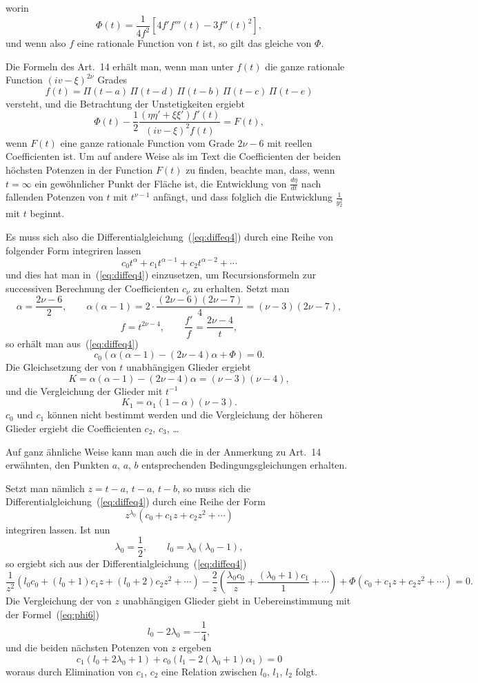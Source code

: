 \documentclass[12pt,a4paper]{article}
\begin{document}
worin
\begin{equation}\label{eq:phi5}
\Phi(t) = \frac{1}{4f^2}\left[4f'f'''(t) - 3f''(t)^2\right],
\end{equation}
und wenn also $f$ eine rationale Function von $t$ ist, so gilt das gleiche von $\Phi$.

Die Formeln des Art.~14 erh\"alt man, wenn man unter $f(t)$ die ganze rationale Function $(iv - \xi)^{2\nu}$ Grades
\[
f(t) = \Pi(t-a)\,\Pi(t-d)\,\Pi(t-b)\,\Pi(t-c)\,\Pi(t-e)
\]
versteht, und die Betrachtung der Unstetigkeiten ergiebt
\begin{equation}\label{eq:phi6}
\Phi(t) - \frac{1}{2}\frac{(\eta\eta'+\xi\xi')f'(t)}{(iv-\xi)^2f(t)} = F(t),
\end{equation}
wenn $F(t)$ eine ganze rationale Function vom Grade $2\nu-6$ mit reellen Coefficienten ist. Um auf andere Weise als im Text die Coefficienten der beiden h\"ochsten Potenzen in der Function $F(t)$ zu finden, beachte man, dass, wenn $t=\infty$ ein gew\"ohnlicher Punkt der Fl\"ache ist, die Entwicklung von $\frac{d\eta}{dt}$ nach fallenden Potenzen von $t$ mit $t^{\nu-1}$ anf\"angt, und dass folglich die Entwicklung $\frac{1}{y_2^2}$ mit $t$ beginnt.

Es muss sich also die Differentialgleichung~(\ref{eq:diffeq4}) durch eine Reihe von folgender Form integriren lassen
\[
c_0 t^\alpha + c_1 t^{\alpha-1} + c_2 t^{\alpha-2} + \cdots
\]
und dies hat man in~(\ref{eq:diffeq4}) einzusetzen, um Recursionsformeln zur successiven Berechnung der Coefficienten $c_\nu$ zu erhalten. Setzt man
\[
\alpha = \frac{2\nu-6}{2}, \qquad
\alpha(\alpha-1) = 2\cdot\frac{(2\nu-6)(2\nu-7)}{4} = (\nu-3)(2\nu-7),
\]
\[
f = t^{2\nu-4}, \qquad \frac{f'}{f} = \frac{2\nu-4}{t},
\]
so erh\"alt man aus~(\ref{eq:diffeq4})
\[
c_0(\alpha(\alpha-1) - (2\nu-4)\alpha + \Phi) = 0.
\]
Die Gleichsetzung der von $t$ unabh\"angigen Glieder ergiebt
\[
K = \alpha(\alpha-1) - (2\nu-4)\alpha = (\nu-3)(\nu-4),
\]
und die Vergleichung der Glieder mit $t^{-1}$
\[
K_1 = \alpha_1(1-\alpha)(\nu-3).
\]
$c_0$ und $c_1$ k\"onnen nicht bestimmt werden und die Vergleichung der h\"oheren Glieder ergiebt die Coefficienten $c_2$, $c_3$, \ldots

Auf ganz \"ahnliche Weise kann man auch die in der Anmerkung zu Art.~14 erw\"ahnten, den Punkten $a$, $a$, $b$ entsprechenden Bedingungsgleichungen erhalten.

Setzt man n\"amlich $z = t-a$, $t-a$, $t-b$, so muss sich die Differentialgleichung~(\ref{eq:diffeq4}) durch eine Reihe der Form
\[
z^{\lambda_0}(c_0 + c_1 z + c_2 z^2 + \cdots)
\]
integriren lassen. Ist nun
\[
\lambda_0 = \frac{1}{2}, \qquad l_0 = \lambda_0(\lambda_0-1),
\]
so ergiebt sich aus der Differentialgleichung~(\ref{eq:diffeq4})
\[
\frac{1}{z^2}\left(l_0 c_0 + (l_0+1)c_1 z + (l_0+2)c_2 z^2 + \cdots\right) - \frac{2}{z}\left(\frac{\lambda_0 c_0}{z} + \frac{(\lambda_0+1)c_1}{1} + \cdots\right) + \Phi(c_0 + c_1 z + c_2 z^2 + \cdots) = 0.
\]
Die Vergleichung der von $z$ unabh\"angigen Glieder giebt in Uebereinstimmung mit der Formel~(\ref{eq:phi6})
\[
l_0 - 2\lambda_0 = -\frac{1}{4},
\]
und die beiden n\"achsten Potenzen von $z$ ergeben
\[
c_1(l_0 + 2\lambda_0 + 1) + c_0(l_1 - 2(\lambda_0+1)\alpha_1) = 0
\]
woraus durch Elimination von $c_1$, $c_2$ eine Relation zwischen $l_0$, $l_1$, $l_2$ folgt.
\end{document}
